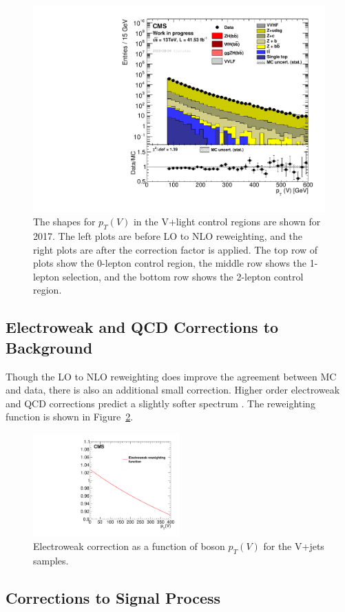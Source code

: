 \begin{figure}
  \includegraphics[width=0.45\linewidth]{figures/Vjets_NLOreweighting_2017V5_Zll_withWeight.pdf}
  \caption[LO to NLO reweighting shape comparisons]{
    The shapes for $p_T(V)$ in the V+light control regions are shown for 2017.
    The left plots are before LO to NLO reweighting,
    and the right plots are after the correction factor is applied.
    The top row of plots show the 0-lepton control region,
    the middle row shows the 1-lepton selection,
    and the bottom row shows the 2-lepton control region.
  }
  \label{fig:nlo-reweight}
\end{figure}

\subsection{Electroweak and QCD Corrections to Background}

Though the LO to NLO reweighting does improve the agreement between MC and data,
there is also an additional small correction.
Higher order electroweak and QCD corrections predict a slightly softer spectrum
\cite{Kallweit_2016}.
The reweighting function is shown in Figure~\ref{fig:EWKcorr}.

\begin{figure}
  \centering
  \includegraphics[width=0.5\textwidth]{figures/EWKcorr.pdf}
  \caption[Electroweak corrections to background]{
    Electroweak correction as a function of boson $p_T(V)$ for the V+jets samples.
  }
  \label{fig:EWKcorr}
\end{figure}


\subsection{Corrections to Signal Process}

